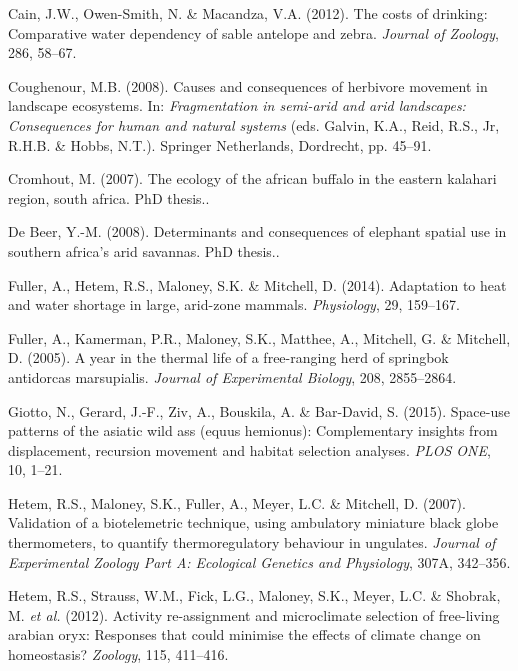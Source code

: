 \documentclass[10pt,twocolumn]{paper}
\begin{document}
\hypertarget{ref-JZO:JZO848}{}
Cain, J.W., Owen-Smith, N. \& Macandza, V.A. (2012). The costs of
drinking: Comparative water dependency of sable antelope and zebra.
\emph{Journal of Zoology}, 286, 58--67.

\hypertarget{ref-Coughenour2008}{}
Coughenour, M.B. (2008). Causes and consequences of herbivore movement
in landscape ecosystems. In: \emph{Fragmentation in semi-arid and arid
landscapes: Consequences for human and natural systems} (eds. Galvin,
K.A., Reid, R.S., Jr, R.H.B. \& Hobbs, N.T.). Springer Netherlands,
Dordrecht, pp. 45--91.

\hypertarget{ref-cromhout2007ecology}{}
Cromhout, M. (2007). The ecology of the african buffalo in the eastern
kalahari region, south africa. PhD thesis..

\hypertarget{ref-de2008determinants}{}
De Beer, Y.-M. (2008). Determinants and consequences of elephant spatial
use in southern africa's arid savannas. PhD thesis..

\hypertarget{ref-Fuller159}{}
Fuller, A., Hetem, R.S., Maloney, S.K. \& Mitchell, D. (2014).
Adaptation to heat and water shortage in large, arid-zone mammals.
\emph{Physiology}, 29, 159--167.

\hypertarget{ref-Fuller2855}{}
Fuller, A., Kamerman, P.R., Maloney, S.K., Matthee, A., Mitchell, G. \&
Mitchell, D. (2005). A year in the thermal life of a free-ranging herd
of springbok antidorcas marsupialis. \emph{Journal of Experimental
Biology}, 208, 2855--2864.

\hypertarget{ref-giotto2015}{}
Giotto, N., Gerard, J.-F., Ziv, A., Bouskila, A. \& Bar-David, S.
(2015). Space-use patterns of the asiatic wild ass (equus hemionus):
Complementary insights from displacement, recursion movement and habitat
selection analyses. \emph{PLOS ONE}, 10, 1--21.

\hypertarget{ref-JEZ:JEZ389}{}
Hetem, R.S., Maloney, S.K., Fuller, A., Meyer, L.C. \& Mitchell, D.
(2007). Validation of a biotelemetric technique, using ambulatory
miniature black globe thermometers, to quantify thermoregulatory
behaviour in ungulates. \emph{Journal of Experimental Zoology Part A:
Ecological Genetics and Physiology}, 307A, 342--356.

\hypertarget{ref-hetem2012411}{}
Hetem, R.S., Strauss, W.M., Fick, L.G., Maloney, S.K., Meyer, L.C. \&
Shobrak, M. \emph{et al.} (2012). Activity re-assignment and
microclimate selection of free-living arabian oryx: Responses that could
minimise the effects of climate change on homeostasis? \emph{Zoology},
115, 411--416.
\end{document}
